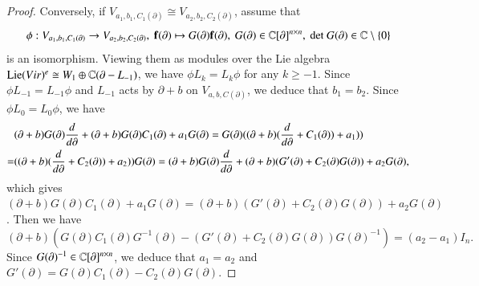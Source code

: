\documentclass[12pt]{amsart}
\begin{document}
\begin{proof}
Conversely, if $V_{a_1,b_1,C_1(\partial)}\cong V_{a_2,b_2,C_2(\partial)}$,  assume that
$$\phi: V_{a_1,b_1,C_1(\partial)}\rightarrow V_{a_2,b_2,C_2(\partial)},\ \mathbf{f}(\partial)\mapsto G(\partial)\mathbf{f}(\partial),\ G(\partial)\in\C[\partial]^{n\times n},\ \text{det}~G(\partial)\in\C\setminus \{0\}$$ is an isomorphism. Viewing them as modules over the Lie algebra $\text{Lie}( Vir)^e\cong W_1\oplus \mathbb{C}(\partial-L_{-1})$, we have $\phi L_k=L_k \phi$ for any $k\geq -1$. Since $\phi L_{-1}=L_{-1}\phi$ and $L_{-1}$ acts by $\partial+b$ on $V_{a,b,C(\partial)}$, we deduce that $b_1=b_2$. Since $\phi L_0=L_0\phi$, we have
\begin{equation*}
\aligned
&(\partial+b) G(\partial)\frac{d}{d\partial}+ (\partial+b)G(\partial)C_1(\partial)+a_1G(\partial)
=G(\partial)((\partial+b)(\frac{d}{d\partial}+C_1(\partial))+a_1))\\
=&((\partial+b)(\frac{d}{d\partial}+C_2(\partial))+a_2))G(\partial)
=(\partial+b) G(\partial)\frac{d}{d\partial}+(\partial+b)(G'(\partial)+C_2(\partial)G(\partial))+a_2G(\partial),
\endaligned
\end{equation*}
which gives $(\partial+b) G(\partial)C_1(\partial)+a_1G(\partial)=(\partial+b)(G'(\partial)+C_2(\partial)G(\partial))+a_2G(\partial)$. Then we have $$(\partial+b)(G(\partial)C_1(\partial)G^{-1}(\partial)-(G'(\partial)+C_2(\partial)G(\partial))G(\partial)^{-1})=(a_2-a_1)I_n.$$
Since $G(\partial)^{-1}\in\mathbb{C}[\partial]^{n\times n}$, we deduce that $a_1=a_2$ and $G'(\partial)=G(\partial)C_1(\partial)-C_2(\partial)G(\partial)$.
\end{proof}
\end{document}
